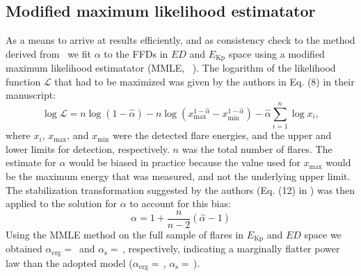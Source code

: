 \documentclass{aa}
\begin{document}
\begin{appendix}
\section{Modified maximum likelihood estimatator}
\label{sec:app:MMLE}
As a means to arrive at results efficiently, and as consistency check to the method derived from~\citet{wheatland_flaresbayes_2004} we fit $\alpha$ to the FFDs in $ED$ and $E_\mathrm{Kp}$ space using a modified maximum likelihood estimatator (MMLE,~ \citealt{maschberger2009}). The logarithm of the likelihood function $\mathcal{L}$ that had to be maximized was given by the authors in Eq. (8) in their manuscript:
\begin{equation}
\log \mathcal{L} = n \log (1-\hat{\alpha})-n \log\left(x_\mathrm{max}^{1-\hat{\alpha}}-x_\mathrm{min}^{1-\hat{\alpha}}\right) - \hat{\alpha} \displaystyle\sum_{i=1}^{n}\log x_i,
\label{eqn:MLE}
\end{equation}
where $x_i$, $x_\mathrm{max}$, and $x_\mathrm{min}$ were the detected flare energies, and the upper and lower limits for detection, respectively. $n$ was the total number of flares. The estimate for $\alpha$ would be biased in practice because the value used for $x_\mathrm{max}$ would be the maximum energy that was measured, and not the underlying upper limit. The stabilization transformation suggested by the authors (Eq. (12) in \citealt{maschberger2009}) was then applied to the solution for $\alpha$ to account for this bias:
\begin{equation}
\alpha = 1 + \dfrac{n}{n-2}(\hat{\alpha} - 1)
\label{eqn:MLE_stabilize}
\end{equation}
Using the MMLE method on the full sample of flares in $E_\mathrm{Kp}$ and $ED$ space we obtained $\alpha_\mathrm{erg}=$\, and $\alpha_\mathrm{s}=$\,\unskip, respectively, indicating a marginally flatter power law than the adopted \citet{wheatland_flaresbayes_2004} model ($\alpha_\mathrm{erg}=$\,, $\alpha_\mathrm{s}=$\,).
\end{appendix}
\end{document}
